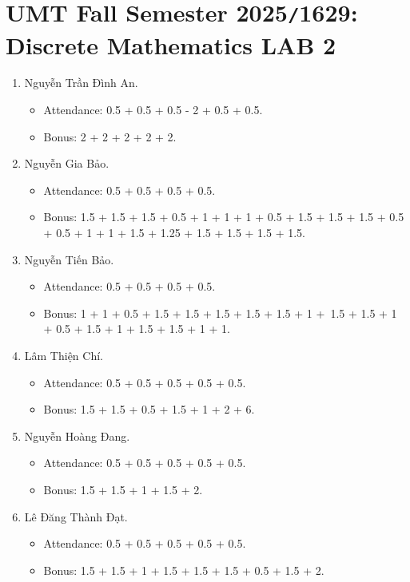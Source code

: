 \documentclass{article}
\begin{document}
\section{UMT Fall Semester 2025{\tt/}1629: Discrete Mathematics LAB 2}

\begin{enumerate}
    \item {\sc Nguyễn Trần Đình An.}
    \begin{itemize}
        \item Attendance: 0.5 + 0.5 + 0.5 - 2 + 0.5 + 0.5.
        \item Bonus: 2 + 2 + 2 + 2 + 2.
    \end{itemize}
    \item {\sc Nguyễn Gia Bảo.}
    \begin{itemize}
        \item Attendance: 0.5 + 0.5 + 0.5 + 0.5.
        \item Bonus: 1.5 + 1.5 + 1.5 + 0.5 + 1 + 1 + 1 + 0.5 + 1.5 + 1.5 + 1.5 + 0.5 + 0.5 + 1 + 1 + 1.5 + 1.25 + 1.5 + 1.5 + 1.5 + 1.5.
    \end{itemize}
    \item {\sc Nguyễn Tiến Bảo.}
    \begin{itemize}
        \item Attendance: 0.5 + 0.5 + 0.5 + 0.5.
        \item Bonus: 1 + 1 + 0.5 + 1.5 + 1.5 + 1.5 + 1.5 + 1.5 + 1 + 1.5 + 1.5 + 1 + 0.5 + 1.5 + 1 + 1.5 + 1.5 + 1 + 1.
    \end{itemize}
    \item {\sc Lâm Thiện Chí.}
    \begin{itemize}
        \item Attendance: 0.5 + 0.5 + 0.5 + 0.5 + 0.5.
        \item Bonus: 1.5 + 1.5 + 0.5 + 1.5 + 1 + 2 + 6.
    \end{itemize}
    \item {\sc Nguyễn Hoàng Đang.}
    \begin{itemize}
        \item Attendance: 0.5 + 0.5 + 0.5 + 0.5 + 0.5.
        \item Bonus: 1.5 + 1.5 + 1 + 1.5 + 2.
    \end{itemize}
    \item {\sc Lê Đăng Thành Đạt.}
    \begin{itemize}
        \item Attendance: 0.5 + 0.5 + 0.5 + 0.5 + 0.5.
        \item Bonus: 1.5 + 1.5 + 1 + 1.5 + 1.5 + 1.5 + 0.5 + 1.5 + 2.

\end{itemize}
\end{enumerate}
\end{document}

